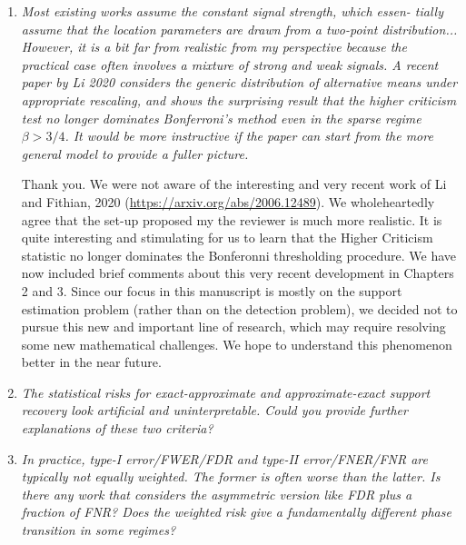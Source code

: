 \documentclass[11pt]{article}
\begin{document}
   \begin{enumerate}
    \item {\em Most existing works assume the constant signal strength, which essen- tially assume that the location parameters are drawn from a two-point distribution... However, it is a bit far from realistic from my perspective because the practical case often involves a mixture of strong and weak signals. A recent paper by Li 2020 considers the generic distribution of alternative means under appropriate rescaling, and shows the surprising result that the higher criticism test no longer dominates Bonferroni’s method even in the sparse regime $\beta >3/4$. It would be more instructive if the paper can start from the more general model to provide a fuller picture.}
    
    \medskip
    Thank you.  We were not aware of the interesting and very recent work of Li and Fithian, 2020 (\url{https://arxiv.org/abs/2006.12489}). We wholeheartedly 
    agree that the set-up proposed my the reviewer is much more realistic.  It is quite interesting and stimulating for us to learn that the Higher Criticism
    statistic no longer dominates the Bonferonni thresholding procedure.  We have now included brief comments
    about this very recent development in Chapters 2 and 3.  Since our focus in this manuscript is mostly on the support estimation problem (rather than on the 
     detection problem), we decided not to pursue this new and important line of research, which may require resolving some new mathematical challenges. 
     We hope to understand this phenomenon better in the near future.
     
     
    \item {\em The statistical risks for exact-approximate and approximate-exact support recovery look artificial and uninterpretable. 
    Could you provide further explanations of these two criteria?} 
    
        
        \item {\em In practice, type-I error/FWER/FDR and type-II error/FNER/FNR are typically not equally weighted. The former is often worse than the latter. Is there any work that considers the asymmetric version like FDR plus a fraction of FNR? Does the weighted risk give a fundamentally different phase transition in some regimes?}
        

\end{enumerate}
\end{document}
